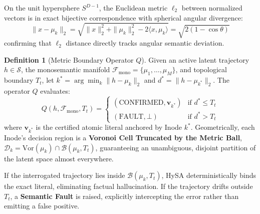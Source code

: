 \documentclass[10pt,twocolumn]{article}
\theoremstyle{definition}
\newtheorem{definition}{Definition}
\begin{document}
On the unit hypersphere $S^{D-1}$, the Euclidean metric $\ell_2$ between normalized vectors is in exact bijective correspondence with spherical angular divergence:
\begin{equation}
    \|x - \mu_k\|_2 = \sqrt{\|x\|_2^2 + \|\mu_k\|_2^2 - 2 \langle x, \mu_k \rangle} = \sqrt{2(1 - \cos\theta)}
\end{equation}
confirming that $\ell_2$ distance directly tracks angular semantic deviation.

\begin{definition}[Metric Boundary Operator $Q$]
Given an active latent trajectory $h \in \mathcal{S}$, the monosemantic manifold $\mathcal{F}_{\mathrm{mono}} = \{\mu_1, \dots, \mu_M\}$, and topological boundary $T_t$, let $k^* = \arg\min_k \|h - \mu_k\|_2$ and $d^* = \|h - \mu_{k^*}\|_2$. The operator $Q$ evaluates:
{\small
\begin{equation}
    Q(h, \mathcal{F}_{\mathrm{mono}}, T_t) = 
    \begin{cases} 
      (\mathrm{CONFIRMED}, \mathbf{v}_{k^*}) & \text{if } d^* \le T_t \\ 
      (\mathrm{FAULT}, \bot) & \text{if } d^* > T_t 
    \end{cases}
    \label{eq:query_operator}
\end{equation}
}
where $\mathbf{v}_{k^*}$ is the certified atomic literal anchored by Inode $k^*$. Geometrically, each Inode's decision region is a \textbf{Voronoi Cell Truncated by the Metric Ball}, $\mathcal{D}_k = \mathrm{Vor}(\mu_k) \cap \mathcal{B}(\mu_k, T_t)$, guaranteeing an unambiguous, disjoint partition of the latent space almost everywhere.
\end{definition}

If the interrogated trajectory lies inside $\mathcal{B}(\mu_k, T_t)$, HySA deterministically binds the exact literal, eliminating factual hallucination. If the trajectory drifts outside $T_t$, a \textbf{Semantic Fault} is raised, explicitly intercepting the error rather than emitting a false positive.
\end{document}
